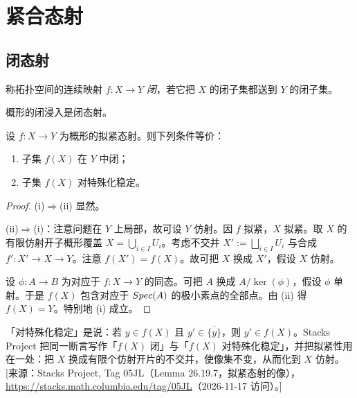
\section{紧合态射}\label{sec:24}

\subsection{闭态射}\label{sec:24.1}

\begin{definition}\label{def:24.1.1}
称拓扑空间的连续映射 $f\colon X \to Y$ \emph{闭}，若它把 $X$ 的闭子集都送到 $Y$ 的闭子集。
\end{definition}

\begin{example}\label{ex:24.1.2}
概形的闭浸入是闭态射。
\end{example}

\begin{lemma}\label{lem:24.1.3}
设 $f\colon X \to Y$ 为概形的拟紧态射。则下列条件等价：
\begin{enumerate}[label=(\roman*),leftmargin=2em,itemsep=0.25ex]
  \item 子集 $f(X)$ 在 $Y$ 中闭；
  \item 子集 $f(X)$ 对特殊化稳定。
\end{enumerate}
\end{lemma}

\begin{proof}
(i)$\Rightarrow$(ii) 显然。

(ii)$\Rightarrow$(i)：注意问题在 $Y$ 上局部，故可设 $Y$ 仿射。因 $f$ 拟紧，$X$ 拟紧。取 $X$ 的有限仿射开子概形覆盖 $X = \bigcup_{i \in I} U_i$。考虑不交并 $X' := \bigsqcup_{i \in I} U_i$ 与合成 $f'\colon X' \to X \to Y$。注意 $f(X') = f(X)$。故可把 $X$ 换成 $X'$，假设 $X$ 仿射。

设 $\phi\colon A \to B$ 为对应于 $f\colon X \to Y$ 的同态。可把 $A$ 换成 $A/\ker(\phi)$，假设 $\phi$ 单射。于是 $f(X)$ 包含对应于 $Spec(A)$ 的极小素点的全部点。由 (ii) 得 $f(X) = Y$。特别地 (i) 成立。
\end{proof}

\begin{yizhu}
「对特殊化稳定」是说：若 $y \in f(X)$ 且 $y' \in \overline{\{y\}}$，则 $y' \in f(X)$。Stacks Project 把同一断言写作「$f(X)$ 闭」与「$f(X)$ 对特殊化稳定」，并把拟紧性用在一处：把 $X$ 换成有限个仿射开片的不交并，使像集不变，从而化到 $X$ 仿射。
[来源：Stacks Project, Tag 05JL（Lemma 26.19.7，拟紧态射的像），\url{https://stacks.math.columbia.edu/tag/05JL}（2026-11-17 访问）。]
\end{yizhu}

